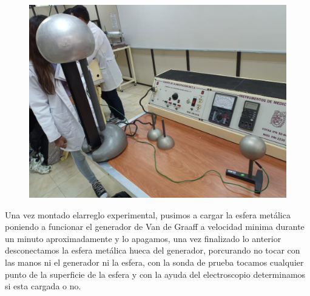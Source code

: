 \documentclass[10pt]{article}
\begin{document}
\begin{multicols}{2}
\begin{figure}[h]
\centering
\includegraphics[scale=0.07]{p4}
\caption{}
\end{figure}

Una vez montado elarreglo experimental, pusimos a cargar la esfera metálica poniendo a funcionar el generador de Van de Graaff a velocidad minima durante un minuto aproximadamente y lo apagamos, una vez finalizado lo anterior desconectamos la esfera metálica hueca del generador, porcurando no tocar con las manos ni el generador ni la esfera, con la sonda de prueba tocamos cualquier punto de la superficie de la esfera y con la ayuda del electroscopio determinamos si esta cargada o no.


\end{multicols}
\end{document}
